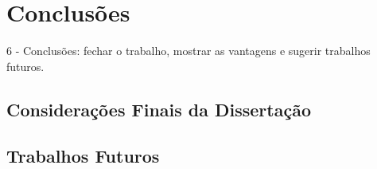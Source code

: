 \chapter{Conclusões}


6 - Conclusões: fechar o trabalho, mostrar as vantagens e sugerir trabalhos futuros.

\section{Considerações Finais da Dissertação}

\section{Trabalhos Futuros}